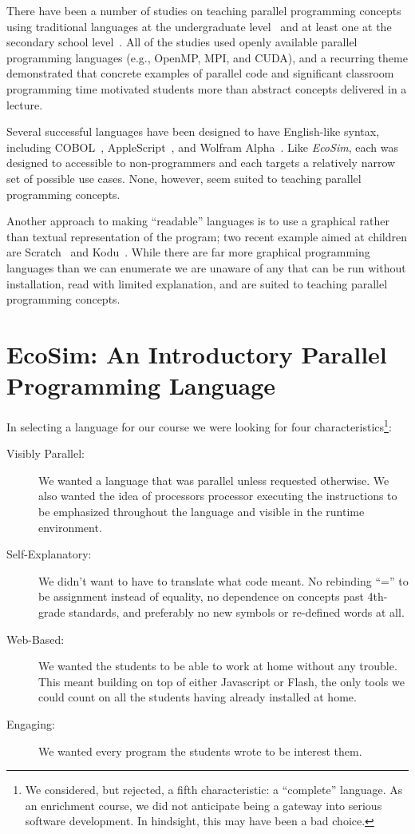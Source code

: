 \documentclass{sig-alternate}
\newcommand{\EcoSim}{\emph{EcoSim}}
\begin{document}
There have been a number of studies on teaching 
parallel programming concepts using traditional languages at the 
undergraduate level~\cite{freshmanParallel,undergraduateParallel,gridPortal} 
and at least one at the secondary school level~\cite{highSchoolParallel}.
All of the studies used openly available parallel programming languages (e.g., OpenMP, 
MPI, and CUDA), and a recurring theme demonstrated that concrete examples of parallel
code and significant classroom programming time motivated students more than abstract concepts
delivered in a lecture.


Several successful languages have been designed to have English-like syntax,
including COBOL~\cite{COBOL59}, AppleScript~\cite{AppleScript}, and Wolfram Alpha~\cite{WolframAlpha}.
Like \EcoSim{}, each was designed to accessible to non-programmers
and each targets a relatively narrow set of possible use cases.
None, however, seem suited to teaching parallel programming concepts.

Another approach to making ``readable'' languages 
is to use a graphical rather than textual representation of the program;
two recent example aimed at children are Scratch~\cite{Scratch} and Kodu~\cite{Kodu}.
While there are far more graphical programming languages than we can enumerate
we are unaware of any that can be run without installation, 
read with limited explanation, and are suited to teaching parallel programming concepts.



\section{EcoSim: An Introductory Parallel Programming Language}
In selecting a language for our course we were looking for four characteristics\footnote{
We considered, but rejected, a fifth characteristic: a ``complete'' language.
As an enrichment course, we did not anticipate being a gateway into serious software development.
In hindsight, this may have been a bad choice.
}:
\begin{description}
	\item[Visibly Parallel:]
		We wanted a language that was parallel unless requested otherwise.
		We also wanted the idea of processors processor executing the instructions
		to be emphasized throughout the language and visible in the runtime environment.
	\item[Self-Explanatory:]
		We didn't want to have to translate what code meant.
		No rebinding ``='' to be assignment instead of equality,
		no dependence on concepts past 4th-grade standards,
		and preferably no new symbols or re-defined words at all.
	\item[Web-Based:]
		We wanted the students to be able to work at home without any trouble.
		This meant building on top of either Javascript or Flash, 
		the only tools we could count on all the students having already installed at home.
	\item[Engaging:]
		We wanted every program the students wrote to be interest them.
\end{description}
\end{document}
